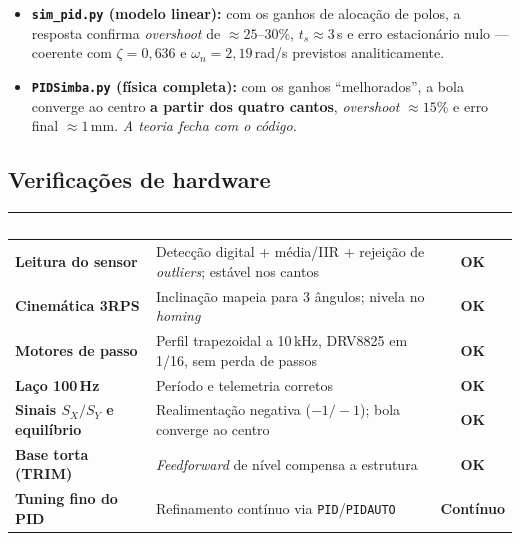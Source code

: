 \documentclass[11pt,a4paper,oneside]{article}
\newcommand{\rowstyle}{\rowcolor{rowgray}}
\begin{document}
\begin{itemize}
  \item \textbf{\texttt{sim\_pid.py} (modelo linear):} com os ganhos de alocação
  de polos, a resposta confirma \emph{overshoot} de $\approx 25$–$30\%$,
  $t_s\approx 3$\,s e erro estacionário nulo — coerente com $\zeta=0{,}636$ e
  $\omega_n=2{,}19$\,rad/s previstos analiticamente.
  \item \textbf{\texttt{PIDSimba.py} (física completa):} com os ganhos
  ``melhorados'', a bola converge ao centro \textbf{a partir dos quatro cantos},
  \emph{overshoot} $\approx 15\%$ e erro final $\approx 1$\,mm. \emph{A teoria
  fecha com o código.}
\end{itemize}

\subsection{Verificações de hardware}

\begin{center}
\small
\renewcommand{\arraystretch}{1.3}
\begin{tabularx}{\textwidth}{>{\bfseries}p{4.5cm} >{\RaggedRight\arraybackslash}X c}
\toprule
\rowcolor{primary}
\textcolor{white}{Item} & \textcolor{white}{Observação} & \textcolor{white}{Status} \\
\midrule
Leitura do sensor & Detecção digital + média/IIR + rejeição de \emph{outliers}; estável nos cantos & \textcolor{success}{\textbf{OK}} \\
\rowstyle Cinemática 3RPS & Inclinação mapeia para 3 ângulos; nivela no \emph{homing} & \textcolor{success}{\textbf{OK}} \\
Motores de passo & Perfil trapezoidal a 10\,kHz, DRV8825 em 1/16, sem perda de passos & \textcolor{success}{\textbf{OK}} \\
\rowstyle Laço 100\,Hz & Período e telemetria corretos & \textcolor{success}{\textbf{OK}} \\
Sinais $S_X/S_Y$ e equilíbrio & Realimentação negativa ($-1/-1$); bola converge ao centro & \textcolor{success}{\textbf{OK}} \\
\rowstyle Base torta (TRIM) & \emph{Feedforward} de nível compensa a estrutura & \textcolor{success}{\textbf{OK}} \\
Tuning fino do PID & Refinamento contínuo via \texttt{PID}/\texttt{PIDAUTO} & \textcolor{accent}{\textbf{Contínuo}} \\
\bottomrule
\end{tabularx}
\end{center}
\end{document}
